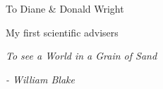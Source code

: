 \begin{center}
    To Diane \& Donald Wright

    My first scientific advisers


    \emph{To see a World in a Grain of Sand}
    
    \emph{- William Blake}
\end{center}
